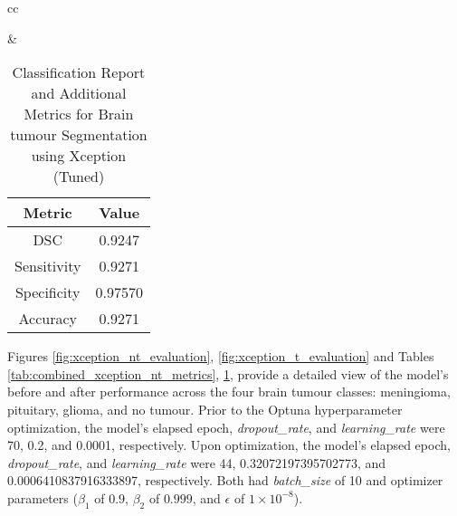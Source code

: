 \begin{table}[ht]
\begin{tabular}{cc}
\begin{minipage}{.6\linewidth}
\begin{subtable}[t]{\linewidth}
                \caption{Classification Report for Brain tumour Segmentation (Tuned)} 
                \label{tab:xception_t_classification_report}
            \end{subtable}
        \end{minipage} &
        \begin{minipage}{.35\linewidth}
            \centering
            \begin{subtable}[t]{\linewidth}
                \centering
                \begin{tabular}{|c|c|}
                    \hline 
                    \textbf{Metric} & \textbf{Value} \\ 
                    \hline
                    DSC & 0.9247 \\ 
                    \hline
                    Sensitivity & 0.9271 \\ 
                    \hline
                    Specificity & 0.97570 \\ 
                    \hline
                    Accuracy & 0.9271 \\ 
                    \hline
                \end{tabular}
                \caption{Additional Metrics for Brain tumour Segmentation (Tuned)} 
                \label{tab:xception_t_additional_metrics}
            \end{subtable}
        \end{minipage}
    \end{tabular}
    \caption{Classification Report and Additional Metrics for Brain tumour Segmentation using Xception (Tuned)}
    \label{tab:combined_xception_t_metrics}
    \end{table}


Figures \ref{fig:xception_nt_evaluation}, \ref{fig:xception_t_evaluation} and Tables \ref{tab:combined_xception_nt_metrics}, \ref{tab:combined_xception_t_metrics}, provide a detailed view of the model's before and after performance across the four brain tumour classes: meningioma, pituitary, glioma, and no tumour. Prior to the Optuna hyperparameter optimization, the model's elapsed epoch, \textit{dropout\_rate}, and \textit{learning\_rate} were 70, 0.2, and 0.0001, respectively. Upon optimization, the model's elapsed epoch, \textit{dropout\_rate}, and \textit{learning\_rate} were 44, 0.32072197395702773, and 0.0006410837916333897, respectively. Both had \textit{batch\_size} of 10 and optimizer parameters ($\beta_1$ of $0.9$, $\beta_2$ of $0.999$, and $\epsilon$ of $1 \times 10^{-8}$).

